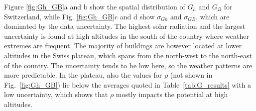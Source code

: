 \begin{table}[tb]
\centering
\footnotesize
{}
\caption{Results for the estimation of $G_h$, $G_B$ and $G_D$, showing the monthly predicted values (in kWh/m$^2$) and the model ($\sigma_M$) and data ($\sigma_D$) uncertainties (no distinction for $G_D$), as percentage of the monthly radiation.}
\label{tab:G_results}
\end{table}

Figure \ref{fig:Gh_GB}a and b show the spatial distribution of $G_h$ and $G_B$ for Switzerland, while Fig. \ref{fig:Gh_GB}c and d show $\sigma_{Gh}$ and $\sigma_{GB}$, which are dominated by the data uncertainty. The highest solar radiation and the largest uncertainty is found at high altitudes in the south of the country where weather extremes are frequent. The majority of buildings are however located at lower altitudes in the Swiss plateau, which spans from the north-west to the north-east of the country. The uncertainty tends to be low here, so the weather patterns are more predictable. In the plateau, also the values for $\rho$ (not shown in Fig.~\ref{fig:Gh_GB}) lie below the averages quoted in Table~\ref{tab:G_results} with a low uncertainty, which shows that $\rho$ mostly impacts the potential at high altitudes.

